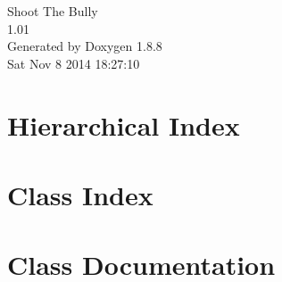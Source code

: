 \documentclass[twoside]{book}
\newcommand{\+}{\discretionary{\mbox{\scriptsize$\hookleftarrow$}}{}{}}
\newcommand{\clearemptydoublepage}{%
  \newpage{\pagestyle{empty}\cleardoublepage}%
}
\begin{document}
\hypersetup{pageanchor=false,
             bookmarks=true,
             bookmarksnumbered=true,
             pdfencoding=unicode
            }
\begin{titlepage}
\vspace*{7cm}
\begin{center}%
{\Large Shoot The Bully \\[1ex]\large 1.\+01 }\\
\vspace*{1cm}
{\large Generated by Doxygen 1.8.8}\\
\vspace*{0.5cm}
{\small Sat Nov 8 2014 18:27:10}\\
\end{center}
\end{titlepage}
\clearemptydoublepage
\tableofcontents
\clearemptydoublepage
{}
\hypersetup{pageanchor=true}

\chapter{Hierarchical Index}

\chapter{Class Index}

\chapter{Class Documentation}




























































\newpage
{}
{}
\printindex
\end{document}
